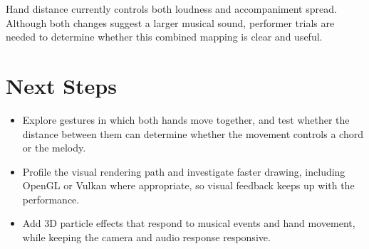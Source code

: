 \documentclass[11pt,a4paper]{article}
\begin{document}
Hand distance currently controls both loudness and accompaniment spread.
Although both changes suggest a larger musical sound, performer trials are
needed to determine whether this combined mapping is clear and useful.

\section{Next Steps}

\begin{itemize}
    \item Explore gestures in which both hands move together, and test whether
    the distance between them can determine whether the movement controls a
    chord or the melody.
    \item Profile the visual rendering path and investigate faster drawing,
    including OpenGL or Vulkan where appropriate, so visual feedback keeps up
    with the performance.
    \item Add 3D particle effects that respond to musical events and hand
    movement, while keeping the camera and audio response responsive.
\end{itemize}
\end{document}
